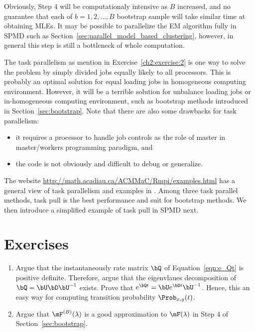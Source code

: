 Obviously, Step 4 will be computationaly intensive as $B$ increased,
and no guarantee that each of $b = 1,2,\ldots, B$ bootstrap sample
will take similar time at obtaining MLEs. It may be possible to parallelize
the EM algorithm fully in SPMD such as
Section~\ref{sec:parallel_model_based_clustering},
however, in general this step is still a bottleneck of whole computation.

The task parallelism as mention in Exercise~\ref{ch2:exercise:2}
is one way to solve the problem by simply divided jobs equally likely
to all processors.
This is probably an optimal solution for equal loading jobs
in homogeneous computing environment. However, it
will be a terrible solution for unbalance loading jobs or in-homogeneous
computing environment, such as
bootstrap methods introduced in Section~\ref{sec:bootstrap}.
Note that there are also some drawbacks for task parallelism:
\begin{itemize}
\item
it requires a processor to handle job controls as the role of master in
master/workers programming paradigm, and
\item
the code is not obviously and difficult to debug or generalize.
\end{itemize}

The website
\href{http://math.acadiau.ca/ACMMaC/Rmpi/examples.html}{
http://math.acadiau.ca/ACMMaC/Rmpi/examples.html}
has a general view of task parallelism and examples in .
Among three task parallel methods, task pull is the best performance and
suit for bootstrap methods.
We then introduce a simplified example of task pull in SPMD next.




\section{Exercises}
\label{sec:phyclust_exercise}

\begin{enumerate}[label=\thechapter-\arabic*]

\item
Argue that the instantaneously rate matrix $\bQ$ of Equation~\ref{eqn:e_Qt}
is positive definite. Therefore, argue that the
eigenvlaues decomposition
of $\bQ = \bU\bD\bU^{-1}$ exists. Prove that
$e^{\bQ t} = \bU e^{\bD t} \bU^{-1}$. Hence, this an easy way for
computing transition probability $\Prob_{x,y}(t)$.

\item
Argue that $\mF^{(B)}(\lambda)$ is a good approximation to $\mF(\lambda)$
in Step 4 of Section~\ref{sec:bootstrap}.

\end{enumerate}

